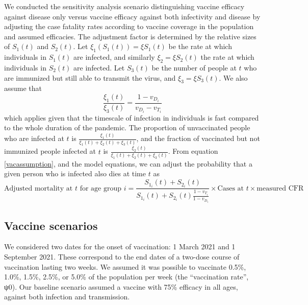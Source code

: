 We conducted the sensitivity analysis scenario distinguishing vaccine efficacy against disease only versus vaccine efficacy against both infectivity and disease by adjusting the case fatality rates according to vaccine coverage in the population and assumed efficacies. The adjustment factor is determined by the relative sizes of $S_1(t)$ and $S_2(t)$. Let $\xi_1 (S_1(t)) = \xi S_1(t)$ be the rate at which individuals in $S_1(t)$ are infected, and similarly $\xi_2 = \xi S_2(t)$ the rate at which individuals in $S_2(t)$ are infected. Let $S_3(t)$ be the number of people at $t$ who are immunized but still able to transmit the virus, and $\xi_3 = \xi S_3(t)$. We also assume that
\begin{equation}
   \frac{\xi_1(t)}{\xi_3(t)} = \frac{1 - v_{D_i}}{v_{D_i} - v_{T_i}}
   \label{vacassumption}
\end{equation}
which applies given that the timescale of infection in individuals is fast compared to the whole duration of the pandemic. The proportion of unvaccinated people who are infected at $t$ is $\frac{\xi_1(t)}{\xi_1(t) + \xi_2(t) + \xi_3(t)}$, and the fraction of vaccinated but not immunized people infected at $t$ is $\frac{\xi_2(t)}{\xi_1(t) + \xi_2(t) + \xi_3(t)}$. From equation \ref{vacassumption}, and the model equations, we can adjust the probability that a given person who is infected also dies at time $t$ as
\begin{equation}
    \textrm{Adjusted mortality at } t  \textrm{ for age group } i = \frac{S_{1_i}(t) + S_{2_i}(t)}{S_{1_i}(t) + S_{2_i}(t)\frac{1 - v_{T_i}}{1 - v_{D_i}}} \times \textrm{Cases at }t \times \textrm{measured CFR}
\end{equation}

\subsection{Vaccine scenarios} 

We considered two dates for the onset of vaccination: 1 March 2021 and 1 September 2021. These correspond to the end dates of a two-dose course of vaccination lasting two weeks. We assumed it was possible to vaccinate 0.5\%, 1.0\%, 1.5\%, 2.5\%, or 5.0\% of the population per week (the “vaccination rate”, ψ0).  Our baseline scenario assumed a vaccine with 75\% efficacy in all ages, against both infection and transmission.  

